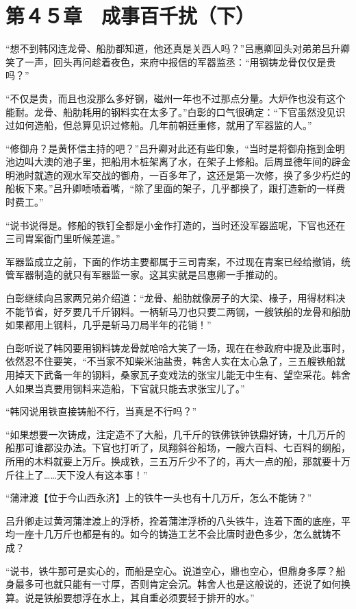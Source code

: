 \section{第４５章　成事百千扰（下）}

“想不到韩冈连龙骨、船肋都知道，他还真是关西人吗？”吕惠卿回头对弟弟吕升卿笑了一声，回头再问趁着夜色，来府中报信的军器监丞：“用钢铸龙骨仅仅是贵吗？”

“不仅是贵，而且也没那么多好钢，磁州一年也不过那点分量。大炉作也没有这个能耐。龙骨、船肋耗用的钢料实在太多了。”白彰的口气很确定：“下官虽然没见识过如何造船，但总算见识过修船。几年前朝廷重修，就用了军器监的人。”

“修御舟？是黄怀信主持的吧？”吕升卿对此还有些印象，“当时是将御舟拖到金明池边叫大澳的池子里，把船用木桩架离了水，在架子上修船。后周显德年间的辟金明池时就造的观水军交战的御舟，一百多年了，这还是第一次修，换了多少朽烂的船板下来。”吕升卿啧啧着嘴，“除了里面的架子，几乎都换了，跟打造新的一样费时费工。”

“说书说得是。修船的铁钉全都是小金作打造的，当时还没军器监呢，下官也还在三司胄案衙门里听候差遣。”

军器监成立之前，下面的作坊主要都属于三司胄案，不过现在胄案已经给撤销，统管军器制造的就只有军器监一家。这其实就是吕惠卿一手推动的。

白彰继续向吕家两兄弟介绍道：“龙骨、船肋就像房子的大梁、椽子，用得材料决不能节省，好歹要几千斤钢料。一柄斩马刀也只要二两钢，一艘铁船的龙骨和船肋如果都用上钢料，几乎是斩马刀局半年的花销！”

白彰听说了韩冈要用钢料铸龙骨就哈哈大笑了一场，现在在参政府中提及此事时，依然忍不住要笑，“不当家不知柴米油盐贵，韩舍人实在太心急了，三五艘铁船就用掉天下武备一年的钢料，桑家瓦子变戏法的张宝儿能无中生有、望空采花。韩舍人如果当真要用钢料来造船，下官就只能去求张宝儿了。”

“韩冈说用铁直接铸船不行，当真是不行吗？”

“如果想要一次铸成，注定造不了大船，几千斤的铁佛铁钟铁鼎好铸，十几万斤的船那可谁都没办法。下官也打听了，凤翔斜谷船场，一艘六百料、七百料的纲船，所用的木料就要上万斤。换成铁，三五万斤少不了的，再大一点的船，那就要十万斤往上了……天下没人有这本事！”

“蒲津渡【位于今山西永济】上的铁牛一头也有十几万斤，怎么不能铸？”

吕升卿走过黄河蒲津渡上的浮桥，拴着蒲津浮桥的八头铁牛，连着下面的底座，平均一座十几万斤也都是有的。如今的铸造工艺不会比唐时逊色多少，怎么就铸不成？

“说书，铁牛那可是实心的，而船是空心。说道空心，鼎也空心，但鼎身多厚？船身最多可也就只能有一寸厚，否则肯定会沉。韩舍人也是这般说的，还说了如何换算。说是铁船要想浮在水上，其自重必须要轻于排开的水。”

